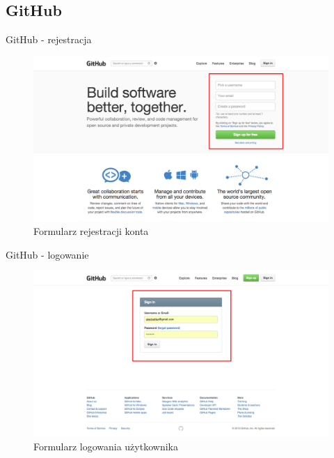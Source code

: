 \documentclass{beamer}
\begin{document}
\subsection{GitHub}

\begin{frame}{GitHub - rejestracja}
  \begin{figure}
  \includegraphics[width=\textwidth]{photos/sign-up.png}
  \caption{\label{fig:sign-up}Formularz rejestracji konta}
  \end{figure}
\end{frame}

\begin{frame}{GitHub - logowanie}
  \begin{figure}
  \includegraphics[width=\textwidth]{photos/sign-in.png}
  \caption{\label{fig:sign-in}Formularz logowania użytkownika}
  \end{figure}
\end{frame}
\end{document}
